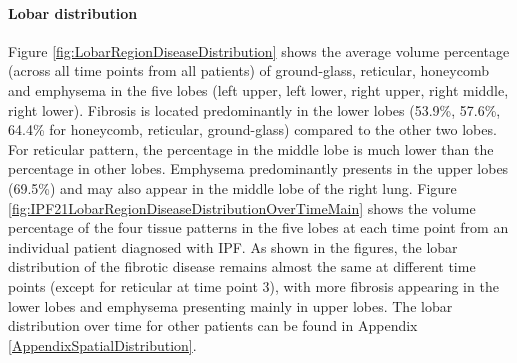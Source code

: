 \paragraph{Lobar distribution}
Figure \ref{fig:LobarRegionDiseaseDistribution} shows the average volume percentage (across all time points from all patients) of ground-glass, reticular, honeycomb and emphysema in the five lobes (left upper, left lower, right upper, right middle, right lower). Fibrosis is located predominantly in the lower lobes (53.9\%, 57.6\%, 64.4\% for honeycomb, reticular, ground-glass) compared to the other two lobes. For reticular pattern, the percentage in the middle lobe is much lower than the percentage in other lobes. Emphysema predominantly presents in the upper lobes (69.5\%) and may also appear in the middle lobe of the right lung. Figure \ref{fig:IPF21LobarRegionDiseaseDistributionOverTimeMain} shows the volume percentage of the four tissue patterns in the five lobes at each time point from an individual patient diagnosed with IPF. As shown in the figures, the lobar distribution of the fibrotic disease remains almost the same at different time points (except for reticular at time point 3), with more fibrosis appearing in the lower lobes and emphysema presenting mainly in upper lobes. The lobar distribution over time for other patients can be found in Appendix \ref{AppendixSpatialDistribution}.  
\newpage

